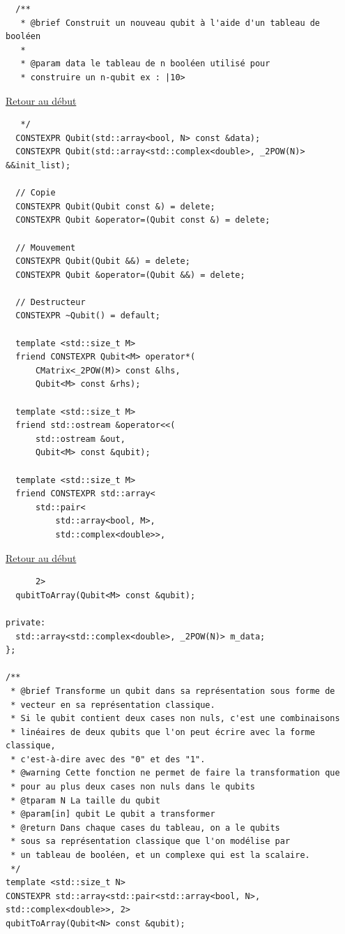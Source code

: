 {\begin{frame}[fragile]
\begin{verbatim}
  /**
   * @brief Construit un nouveau qubit à l'aide d'un tableau de booléen
   *
   * @param data le tableau de n booléen utilisé pour
   * construire un n-qubit ex : |10>
\end{verbatim}
\end{frame}

\begin{frame}[fragile]
\hyperlink{conclusion}{Retour au début}\newline
\begin{verbatim}
   */
  CONSTEXPR Qubit(std::array<bool, N> const &data);
  CONSTEXPR Qubit(std::array<std::complex<double>, _2POW(N)> &&init_list);

  // Copie
  CONSTEXPR Qubit(Qubit const &) = delete;
  CONSTEXPR Qubit &operator=(Qubit const &) = delete;

  // Mouvement
  CONSTEXPR Qubit(Qubit &&) = delete;
  CONSTEXPR Qubit &operator=(Qubit &&) = delete;

  // Destructeur
  CONSTEXPR ~Qubit() = default;

  template <std::size_t M>
  friend CONSTEXPR Qubit<M> operator*(
      CMatrix<_2POW(M)> const &lhs,
      Qubit<M> const &rhs);

  template <std::size_t M>
  friend std::ostream &operator<<(
      std::ostream &out,
      Qubit<M> const &qubit);

  template <std::size_t M>
  friend CONSTEXPR std::array<
      std::pair<
          std::array<bool, M>,
          std::complex<double>>,
\end{verbatim}
\end{frame}

\begin{frame}[fragile]
\hyperlink{conclusion}{Retour au début}\newline
\begin{verbatim}
      2>
  qubitToArray(Qubit<M> const &qubit);

private:
  std::array<std::complex<double>, _2POW(N)> m_data;
};

/**
 * @brief Transforme un qubit dans sa représentation sous forme de
 * vecteur en sa représentation classique.
 * Si le qubit contient deux cases non nuls, c'est une combinaisons
 * linéaires de deux qubits que l'on peut écrire avec la forme classique,
 * c'est-à-dire avec des "0" et des "1".
 * @warning Cette fonction ne permet de faire la transformation que
 * pour au plus deux cases non nuls dans le qubits
 * @tparam N La taille du qubit
 * @param[in] qubit Le qubit a transformer
 * @return Dans chaque cases du tableau, on a le qubits
 * sous sa représentation classique que l'on modélise par
 * un tableau de booléen, et un complexe qui est la scalaire.
 */
template <std::size_t N>
CONSTEXPR std::array<std::pair<std::array<bool, N>, std::complex<double>>, 2>
qubitToArray(Qubit<N> const &qubit);


\end{verbatim}
\end{frame}}
